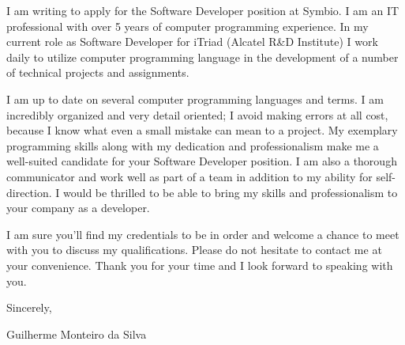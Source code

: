 \documentclass[10pt,a4paper,sans]{moderncv} %
\begin{document}



I am writing to apply for the Software Developer position at Symbio. I am an IT professional with over 5 years of computer programming experience. In my current role as Software Developer for iTriad (Alcatel R\&D Institute) I work daily to utilize computer programming language in the development of a number of technical projects and assignments.

I am up to date on several computer programming languages and terms. I am incredibly organized and very detail oriented; I avoid making errors at all cost, because I know what even a small mistake can mean to a project. My exemplary programming skills along with my dedication and professionalism make me a well-suited candidate for your Software Developer position. I am also a thorough communicator and work well as part of a team in addition to my ability for self-direction. I would be thrilled to be able to bring my skills and professionalism to your company as a developer.

I am sure you'll find my credentials to be in order and welcome a chance to meet with you to discuss my qualifications. Please do not hesitate to contact me at your convenience. Thank you for your time and I look forward to speaking with you.

Sincerely,

Guilherme Monteiro da Silva

\makeletterclosing %

\end{document}
